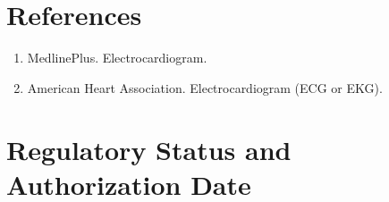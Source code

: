 \section*{References}
\begin{enumerate}
  \item MedlinePlus. Electrocardiogram.
  \item American Heart Association. Electrocardiogram (ECG or EKG).
\end{enumerate}

\clearpage


\section*{Regulatory Status and Authorization Date}

\clearpage
